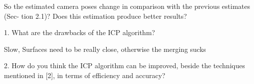 So the estimated camera poses change in comparison with the previous estimates (Sec- tion 2.1)? Does this estimation produce better results?

1. What are the drawbacks of the ICP algorithm?

Slow, Surfaces need to be really close, otherwise the merging sucks

2. How do you think the ICP algorithm can be improved, beside the techniques mentioned in [2], in terms of efficiency and accuracy?



